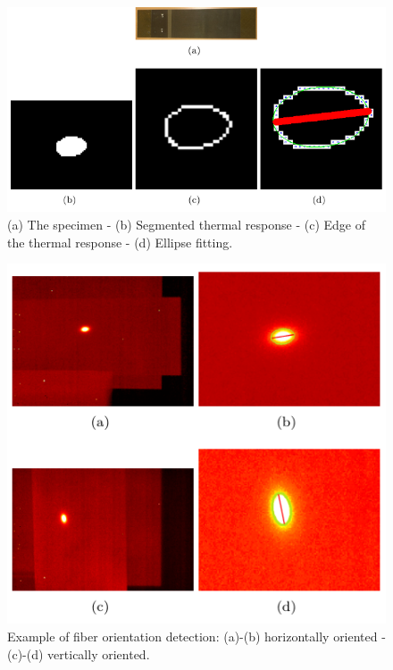 \documentclass[12pt]{spieman}
\begin{document}
\begin{spacing}{2}
\newpage \begin{figure}\centering\includegraphics{Fig11}  
  \caption{(a) The specimen - (b) Segmented thermal response - (c) Edge of the thermal
  response - (d) Ellipse fitting.}
  \label{fig:9}
\end{figure}

\newpage \begin{figure}\centering\includegraphics{Fig12}  
  \caption{Example of fiber orientation detection: (a)-(b) horizontally oriented - (c)-(d)
  vertically oriented.}
  \label{fig:10}
\end{figure}


\end{spacing}
\end{document}
